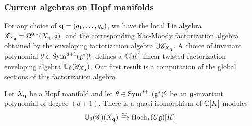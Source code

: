 \subsubsection{Current algebras on Hopf manifolds}

For any choice of ${\bf q} = (q_1,\ldots,q_d)$, we have the local Lie algebra $\mathscr G_{X_{\bf q}} = \Omega^{0,*}(X_{\bf q}, \mathfrak g)$, and the corresponding Kac-Moody factorization algebra obtained by the enveloping factorization algebra $\mathbb U\mathscr G_{X_{\bf q}}$.
A choice of invariant polynomial $\theta \in {\rm Sym}^{d+1}(\mathfrak g^*)^\mathfrak g$ defines a $\mathbb C[K]$-linear twisted factorization enveloping algebra $\mathbb U_{\theta}(\mathscr G_{X_{\bf q}})$.  
Our first result is a computation of the global sections of this factorization algebra.  

\begin{prop}
\label{prop: hopf}
Let $X_{\bf q}$ be a Hopf manifold and let $\theta \in {\rm Sym}^{d+1}(\mathfrak g^*)^\mathfrak g$ be an $\mathfrak g$-invariant polynomial of degree $(d+1)$. 
There is a quasi-isomorphism of $\mathbb C[K]$-modules
\[
\mathbb U_\theta (\mathscr G) (X_{\bf q}) \xrightarrow{\simeq} {\rm Hoch}_*(U \mathfrak g)[K] .
\]
\end{prop}

